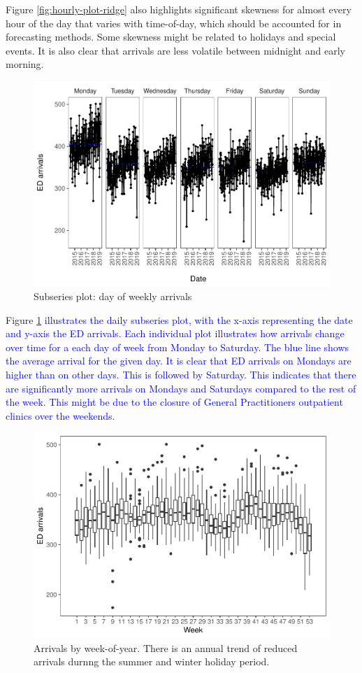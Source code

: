 \documentclass[]{elsarticle} %
\begin{document}
Figure \ref{fig:hourly-plot-ridge} also highlights significant skewness
for almost every hour of the day that varies with time-of-day, which
should be accounted for in forecasting methods. Some skewness might be
related to holidays and special events. It is also clear that arrivals
are less volatile between midnight and early morning.

\begin{figure}[H]

{\centering \includegraphics[width=0.7\linewidth]{paper_files/figure-latex/seasonplot-dofw-1} 

}

\caption{Subseries plot: day of weekly arrivals}\label{fig:seasonplot-dofw}
\end{figure}

Figure \ref{fig:seasonplot-dofw} \textcolor{blue}{ illustrates the daily subseries plot, with the x-axis representing the date and y-axis
the ED arrivals. Each individual plot illustrates how arrivals change over time for a each day
of week from Monday to Saturday. The blue line shows the average arrival for the given day.
It is clear that ED arrivals on Mondays are higher than on other days. This is followed by
Saturday. This indicates that there are significantly more arrivals on Mondays and Saturdays
compared to the rest of the week. This might be due to the closure of General Practitioners
outpatient clinics over the weekends.}

\begin{figure}[H]

{\centering \includegraphics[width=0.7\linewidth]{paper_files/figure-latex/seasonplot-weekofyear-1} 

}

\caption{Arrivals by week-of-year. There is an annual trend of reduced arrivals durnng the summer and winter holiday period.}\label{fig:seasonplot-weekofyear}
\end{figure}
\end{document}
